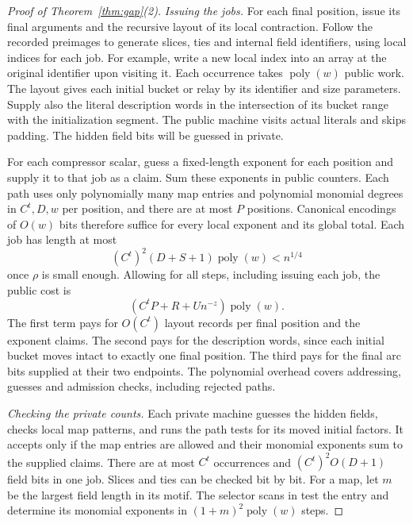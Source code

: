 \begin{proof}[Proof of Theorem~\ref{thm:gap}(2)]
\emph{Issuing the jobs.}
For each final position, issue its final arguments and the recursive
layout of its local contraction. Follow the recorded preimages to
generate slices, ties and internal field identifiers, using local
indices for each job. For example, write a new local index into an
array at the original identifier upon visiting it. Each occurrence
takes $\operatorname{poly}(w)$ public work. The layout gives each
initial bucket or relay by its identifier and size parameters. Supply
also the literal description words in the intersection of its bucket
range with the initialization segment. The public machine visits
actual literals and skips padding. The hidden field bits will be
guessed in private.

For each compressor scalar, guess a fixed-length exponent for each
position and supply it to that job as a claim. Sum these exponents in
public counters. Each path uses only polynomially many map entries
and polynomial monomial degrees in $C^t,D,w$ per position, and there
are at most $P$ positions. Canonical encodings of $O(w)$ bits
therefore suffice for every local exponent and its global total.
Each job has length at most
\[
                 (C^t)^2(D+S+1)\operatorname{poly}(w)<n^{1/4}
\]
once $\rho$ is small enough. Allowing for all steps, including issuing
each job, the public cost is
\begin{equation}\label{eq:dump}
                 (C^t P+R+U n^{-z})\operatorname{poly}(w).
\end{equation}
The first term pays for $O(C^t)$ layout records per final position
and the exponent claims. The second pays for the description words,
since each initial bucket moves intact to exactly one final position.
The third pays for the final arc bits supplied at their two endpoints.
The polynomial overhead covers addressing, guesses and admission checks,
including rejected paths.

\emph{Checking the private counts.}
Each private machine guesses the hidden fields, checks local map
patterns, and runs the path tests for its moved initial factors. It
accepts only if the map entries are allowed and their monomial
exponents sum to the supplied claims. There are at most $C^t$
occurrences and $(C^t)^2 O(D+1)$ field bits in one job. Slices and
ties can be checked bit by bit. For a map, let $m$ be the largest field length in its
motif. The selector scans in
\cite[proof of Theorem~]{oaG} test the entry
and determine its monomial exponents in $(1+m)^2\operatorname{poly}(w)$
steps.


\end{proof}
